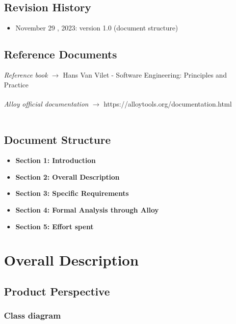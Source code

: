 \documentclass[11pt]{report}
\begin{document}
    \section{Revision History}
    \begin{itemize}
        \item November 29 , 2023: version 1.0 (document structure)
    \end{itemize}

    \section{Reference Documents}
    \emph{Reference book} $\rightarrow$ Hans Van Vilet - Software Engineering: Principles and Practice
    \\ \\
    \emph{Alloy official documentation} $\rightarrow$ https://alloytools.org/documentation.html
    \\ \\
    \section{Document Structure}
    \begin{itemize}
        \item \textbf{Section 1: Introduction}\\
        \item \textbf{Section 2: Overall Description}\\
        \item \textbf{Section 3: Specific Requirements}\\
        \item \textbf{Section 4: Formal Analysis through Alloy} \\
        \item \textbf{Section 5: Effort spent} \\
    \end{itemize}

\chapter{Overall Description}
\section{Product Perspective}

\subsection{Class diagram}
\end{document}
